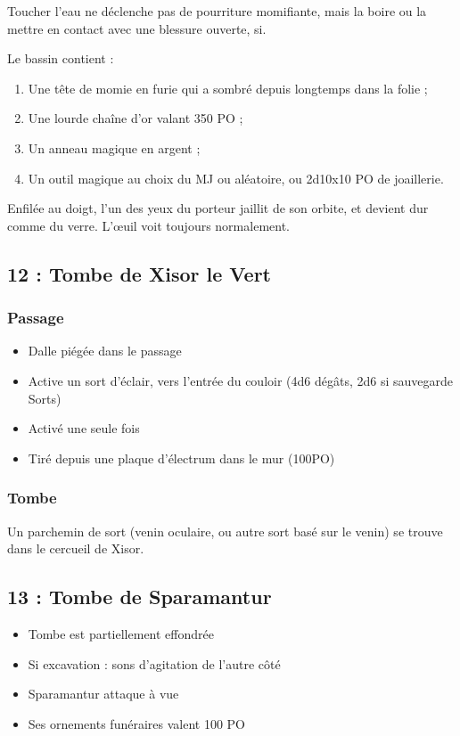 Toucher l’eau ne déclenche pas de pourriture momifiante, mais la boire ou la mettre en contact avec une blessure ouverte, si.

Le bassin contient :
\begin{enumerate}
    \item Une tête de momie en furie qui a sombré depuis longtemps dans la folie ;
    \item Une lourde chaîne d’or valant 350 PO ;
    \item Un anneau magique en argent ;
    \item Un outil magique au choix du MJ ou aléatoire, ou 2d10x10 PO de joaillerie.
\end{enumerate}

\begin{highlight}
Enfilée au doigt, l’un des yeux du porteur jaillit de son orbite, et devient dur comme du verre.
L’\oe uil voit toujours normalement.
\end{highlight}

\subsection{12 : Tombe de Xisor le Vert}\label{n2:s12}
\subsubsection{Passage}
\begin{itemize}
    \item Dalle piégée dans le passage
    \item Active un sort d’éclair, vers l’entrée du couloir (4d6 dégâts, 2d6 si sauvegarde Sorts)
    \item Activé une seule fois
    \item Tiré depuis une plaque d’électrum dans le mur (100PO)
\end{itemize}
\subsubsection{Tombe}
Un parchemin de sort (venin oculaire, ou autre sort basé sur le venin) se trouve dans le
cercueil de Xisor.

\subsection{13 : Tombe de Sparamantur}\label{n2:s13}
\begin{itemize}
    \item Tombe est partiellement effondrée
    \item Si excavation : sons d'agitation de l'autre côté
    \item Sparamantur attaque à vue
    \item Ses ornements funéraires valent 100 PO
\end{itemize}

